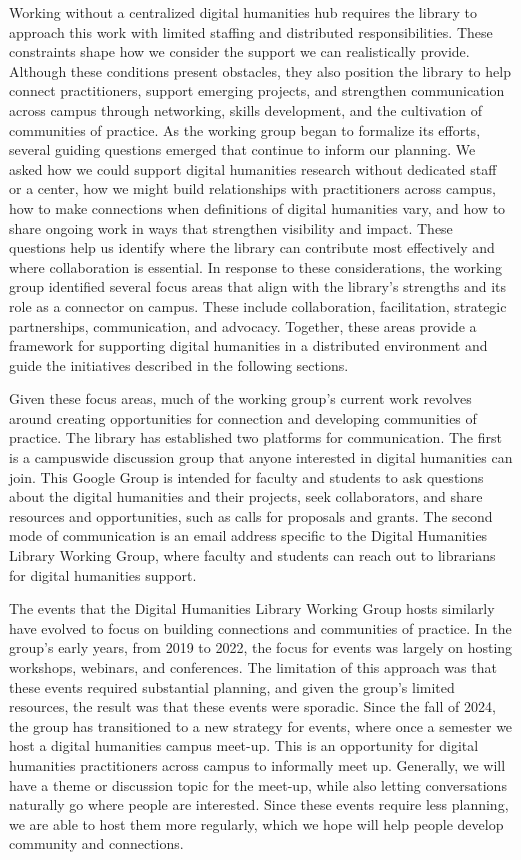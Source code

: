 \documentclass[final]{anthology-ch}
\begin{document}
Working without a centralized digital humanities hub requires the library to approach this work with limited staffing and distributed responsibilities. These constraints shape how we consider the support we can realistically provide. Although these conditions present obstacles, they also position the library to help connect practitioners, support emerging projects, and strengthen communication across campus through networking, skills development, and the cultivation of communities of practice. As the working group began to formalize its efforts, several guiding questions emerged that continue to inform our planning. We asked how we could support digital humanities research without dedicated staff or a center, how we might build relationships with practitioners across campus, how to make connections when definitions of digital humanities vary, and how to share ongoing work in ways that strengthen visibility and impact. These questions help us identify where the library can contribute most effectively and where collaboration is essential. In response to these considerations, the working group identified several focus areas that align with the library's strengths and its role as a connector on campus. These include collaboration, facilitation, strategic partnerships, communication, and advocacy. Together, these areas provide a framework for supporting digital humanities in a distributed environment and guide the initiatives described in the following sections.

Given these focus areas, much of the working group's current work revolves around creating opportunities for connection and developing communities of practice. The library has established two platforms for communication. The first is a campuswide discussion group that anyone interested in digital humanities can join. This Google Group is intended for faculty and students to ask questions about the digital humanities and their projects, seek collaborators, and share resources and opportunities, such as calls for proposals and grants. The second mode of communication is an email address specific to the Digital Humanities Library Working Group, where faculty and students can reach out to librarians for digital humanities support.

The events that the Digital Humanities Library Working Group hosts similarly have evolved to focus on building connections and communities of practice. In the group's early years, from 2019 to 2022, the focus for events was largely on hosting workshops, webinars, and conferences. The limitation of this approach was that these events required substantial planning, and given the group's limited resources, the result was that these events were sporadic. Since the fall of 2024, the group has transitioned to a new strategy for events, where once a semester we host a digital humanities campus meet-up. This is an opportunity for digital humanities practitioners across campus to informally meet up. Generally, we will have a theme or discussion topic for the meet-up, while also letting conversations naturally go where people are interested. Since these events require less planning, we are able to host them more regularly, which we hope will help people develop community and connections.
\end{document}
